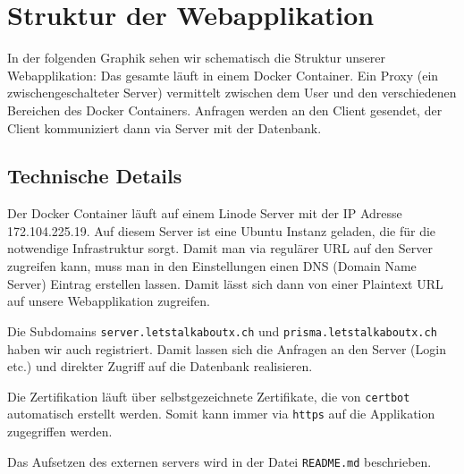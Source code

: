 \section{Struktur der Webapplikation}

In der folgenden Graphik sehen wir schematisch die Struktur unserer Webapplikation: Das gesamte läuft in einem Docker Container. Ein Proxy (ein zwischengeschalteter Server) vermittelt zwischen dem User und den verschiedenen Bereichen des Docker Containers. Anfragen werden an den Client gesendet, der Client kommuniziert dann via Server mit der Datenbank.


\subsection{Technische Details}

Der Docker Container läuft auf einem Linode Server mit der IP Adresse 172.104.225.19. Auf diesem Server ist eine Ubuntu Instanz geladen, die für die notwendige Infrastruktur sorgt. Damit man via regulärer URL auf den Server zugreifen kann, muss man in den Einstellungen einen DNS (Domain Name Server) Eintrag erstellen lassen. Damit lässt sich dann von einer Plaintext URL auf unsere Webapplikation zugreifen. 

Die Subdomains \verb|server.letstalkaboutx.ch| und \verb|prisma.letstalkaboutx.ch| haben wir auch registriert. Damit lassen sich die Anfragen an den Server (Login etc.) und direkter Zugriff auf die Datenbank realisieren.

Die Zertifikation läuft über selbstgezeichnete Zertifikate, die von \verb|certbot| automatisch erstellt werden. Somit kann immer via \verb|https| auf die Applikation zugegriffen werden.

Das Aufsetzen des externen servers wird in der Datei \verb|README.md| beschrieben.












